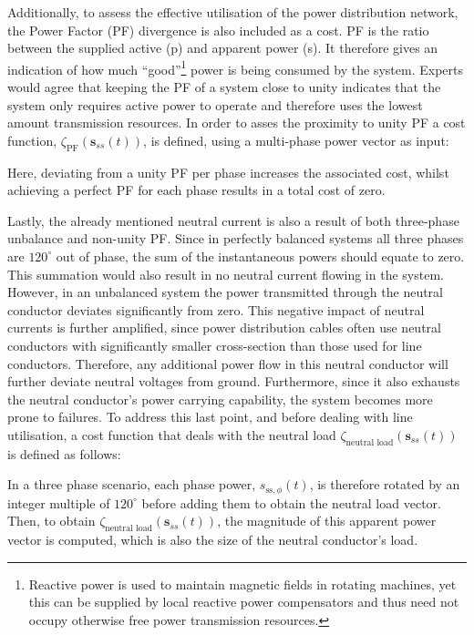 Additionally, to assess the effective utilisation of the power distribution network, the Power Factor (PF) divergence is also included as a cost.
PF is the ratio between the supplied active (p) and apparent power (s).
It therefore gives an indication of how much ``good''\footnote[1]{Reactive power is used to maintain magnetic fields in rotating machines, yet this can be supplied by local reactive power compensators and thus need not occupy otherwise free power transmission resources.} power is being consumed by the system.
Experts would agree that keeping the PF of a system close to unity indicates that the system only requires active power to operate and therefore uses the lowest amount transmission resources.
In order to asses the proximity to unity PF a cost function, $\zeta_\text{PF}(\textbf{s}_{ss}(t))$, is defined, using a multi-phase power vector as input:



Here, deviating from a unity PF per phase increases the associated cost, whilst achieving a perfect PF for each phase results in a total cost of zero.


Lastly, the already mentioned neutral current is also a result of both three-phase unbalance and non-unity PF.
Since in perfectly balanced systems all three phases are $120^\circ$ out of phase, the sum of the instantaneous powers should equate to zero.
This summation would also result in no neutral current flowing in the system.
However, in an unbalanced system the power transmitted through the neutral conductor deviates significantly from zero.
This negative impact of neutral currents is further amplified, since power distribution cables often use neutral conductors with significantly smaller cross-section than those used for line conductors.
Therefore, any additional power flow in this neutral conductor will further deviate neutral voltages from ground.
Furthermore, since it also exhausts the neutral conductor's power carrying capability, the system becomes more prone to failures.
To address this last point, and before dealing with line utilisation, a cost function that deals with the neutral load $\zeta_\text{neutral load}(\textbf{s}_{ss}(t))$ is defined as follows:



In a three phase scenario, each phase power, $s_{\text{ss},\phi}(t)$, is therefore rotated by an integer multiple of $120^\circ$ before adding them to obtain the neutral load vector.
Then, to obtain $\zeta_\text{neutral load}(\textbf{s}_{ss}(t))$, the magnitude of this apparent power vector is computed, which is also the size of the neutral conductor's load.

